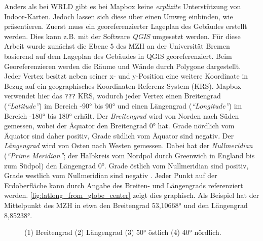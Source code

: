 Anders als bei WRLD gibt es bei Mapbox keine \emph{explizite} Unterstützung von Indoor-Karten.
Jedoch lassen sich diese über einen Umweg einbinden, wie \textcites{Mapbox2018b}{Pavani2018}{Clarke2017} präsentieren.
Zuerst muss ein georeferenzierter Lageplan des Gebäudes erstellt werden.
Dies kann z.B. mit der Software \emph{QGIS} umgesetzt werden.
Für diese Arbeit wurde zunächst die Ebene 5 des MZH an der Universität Bremen basierend auf dem Lageplan des Gebäudes in QGIS georeferenziert.
Beim Georeferenzieren werden die Räume und Wände durch Polygone dargestellt.
Jeder Vertex besitzt neben seiner x- und y-Position eine weitere Koordinate in Bezug auf ein geographisches Koordinaten-Referenz-System (KRS).
Mapbox verwendet hier das \texttt{???} KRS, wodurch jeder Vertex einen Breitengrad (\emph{\enquote{Latitude}}) im Bereich \ang{-90} bis \ang{90} und einen Längengrad (\emph{\enquote{Longitude}}) im Bereich \ang{-180} bis \ang{180} erhält.
Der \emph{Breitengrad} wird von Norden nach Süden gemessen, wobei der Äquator den Breitengrad \ang{0} hat.
Grade nördlich vom Äquator sind daher positiv, Grade südlich vom Äquator sind negativ.
Der \emph{Längengrad} wird von Osten nach Westen gemessen.
Dabei hat der \emph{Nullmeridian} (\emph{\enquote{Prime Meridian}}; der Halbkreis vom Nordpol durch Greenwich in England bis zum Südpol) den Längengrad \ang{0}.
Grade östlich vom Nullmeridian sind positiv, Grade westlich vom Nullmeridian sind negativ \autocite{ESRIInc2018}.
Jeder Punkt auf der Erdoberfläche kann durch Angabe des Breiten- und Längengrads referenziert werden.
\autoref{fig:latlong_from_globe_center} zeigt dies graphisch.
Als Beispiel hat der Mittelpunkt des MZH in etwa den Breitengrad \ang{53,10668} und den Längengrad \ang{8,85238}.

\begin{figure}
    \centering
    \caption{(1) Breitengrad (2) Längengrad (3) \ang[detect-weight=true]{50} östlich (4) \ang[detect-weight=true]{40} nördlich.}
    \label{fig:latlong_from_globe_center}
\end{figure}

